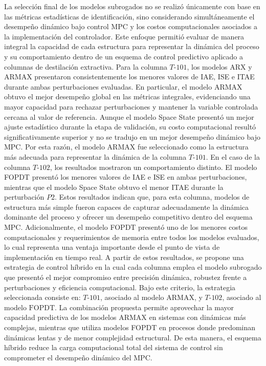 La selección final de los modelos subrogados no se realizó únicamente con base en las métricas estadísticas de identificación, sino considerando simultáneamente el desempeño dinámico bajo control MPC y los costos computacionales asociados a la implementación del controlador. Este enfoque permitió evaluar de manera integral la capacidad de cada estructura para representar la dinámica del proceso y su comportamiento dentro de un esquema de control predictivo aplicado a columnas de destilación extractiva. Para la columna \(T\text{-}101\), los modelos ARX y ARMAX presentaron consistentemente los menores valores de IAE, ISE e ITAE durante ambas perturbaciones evaluadas. En particular, el modelo ARMAX obtuvo el mejor desempeño global en las métricas integrales, evidenciando una mayor capacidad para rechazar perturbaciones y mantener la variable controlada cercana al valor de referencia. Aunque el modelo Space State presentó un mejor ajuste estadístico durante la etapa de validación, su costo computacional resultó significativamente superior y no se tradujo en un mejor desempeño dinámico bajo MPC. Por esta razón, el modelo ARMAX fue seleccionado como la estructura más adecuada para representar la dinámica de la columna \(T\text{-}101\). En el caso de la columna \(T\text{-}102\), los resultados mostraron un comportamiento distinto. El modelo FOPDT presentó los menores valores de IAE e ISE en ambas perturbaciones, mientras que el modelo Space State obtuvo el menor ITAE durante la perturbación \(P2\). Estos resultados indican que, para esta columna, modelos de estructura más simple fueron capaces de capturar adecuadamente la dinámica dominante del proceso y ofrecer un desempeño competitivo dentro del esquema MPC. Adicionalmente, el modelo FOPDT presentó uno de los menores costos computacionales y requerimientos de memoria entre todos los modelos evaluados, lo cual representa una ventaja importante desde el punto de vista de implementación en tiempo real. A partir de estos resultados, se propone una estrategia de control híbrido en la cual cada columna emplea el modelo subrogado que presentó el mejor compromiso entre precisión dinámica, robustez frente a perturbaciones y eficiencia computacional. Bajo este criterio, la estrategia seleccionada consiste en:  \(T\text{-}101\), asociado al modelo \(\mathrm{ARMAX}\), y \(T\text{-}102\), asociado al modelo \(\mathrm{FOPDT}\). La combinación propuesta permite aprovechar la mayor capacidad predictiva de los modelos ARMAX en sistemas con dinámicas más complejas, mientras que utiliza modelos FOPDT en procesos donde predominan dinámicas lentas y de menor complejidad estructural. De esta manera, el esquema híbrido reduce la carga computacional total del sistema de control sin comprometer el desempeño dinámico del MPC. 